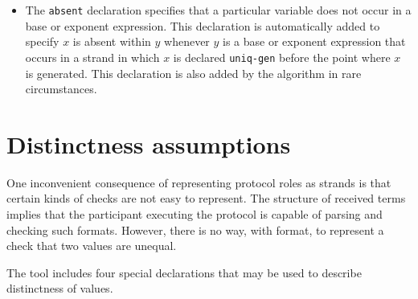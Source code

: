 \begin{itemize}

  \item {} The \texttt{absent} declaration specifies
    that a particular  variable does not occur in a base or
    exponent expression.  This declaration is automatically added to
    specify $x$ is absent within $y$ whenever $y$ is a base or
    exponent expression that occurs in a strand in which $x$ is
    declared \texttt{uniq-gen} before the point where $x$ is
    generated.  This declaration is also added by the algorithm in
    rare circumstances.
\end{itemize}



\iffalse 

\section{Distinctness assumptions}
\label{sec:distinct_decls}

One inconvenient consequence of representing protocol roles as strands
is that certain kinds of checks are not easy to represent.  The
structure of received terms implies that the participant executing the
protocol is capable of parsing and checking such formats.  However,
there is no way, with format, to represent a check that two values are
unequal.

The tool includes four special declarations that may be used to
describe distinctness of values.

